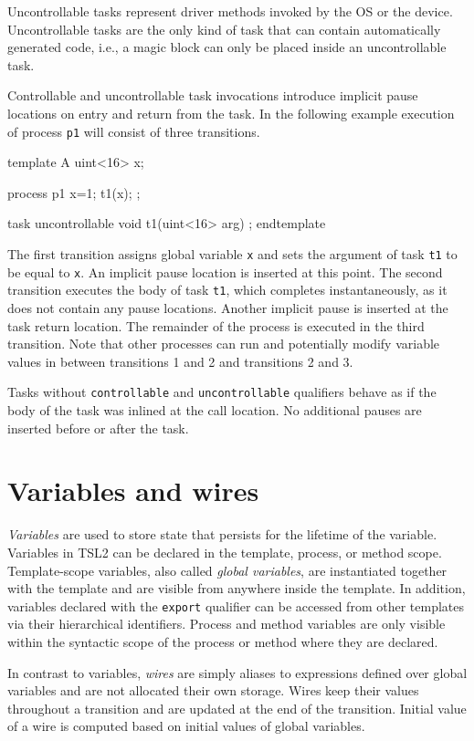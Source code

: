 \documentclass{report}
\newcommand{\src}[1]{\texttt{#1}}
\newcommand{\tsl}{TSL2 }
\begin{document}
Uncontrollable tasks represent driver methods invoked by the OS or 
the device.  Uncontrollable tasks are the only kind of task that 
can contain automatically generated code, i.e., a magic block can 
only be placed inside an uncontrollable task.  

Controllable and uncontrollable task invocations introduce 
implicit pause locations on entry and return from the task.  In 
the following example execution of process \src{p1} will consist 
of three transitions.
\begin{tsllisting}{}
template A
  uint<16> x;

  process p1 {
    x=1;
    t1(x);
  };

  task uncontrollable void t1(uint<16> arg) {};
endtemplate
\end{tsllisting}
The first transition assigns global variable \src{x} and sets the 
argument of task \src{t1} to be equal to \src{x}.   An implicit 
pause location is inserted at this point.  The second transition 
executes the body of task \src{t1}, which completes 
instantaneously, as it does not contain any pause locations.  
Another implicit pause is inserted at the task return location.  
The remainder of the process is executed in the third transition.  
Note that other processes can run and potentially modify variable 
values in between transitions 1 and 2 and transitions 2 and 3.

Tasks without \src{controllable} and \src{uncontrollable} 
qualifiers behave as if the body of the task was inlined at the 
call location.  No additional pauses are inserted before or after 
the task.

\section{Variables and wires}\label{s:o:variables}

\emph{Variables} are used to store state that persists for the 
lifetime of the variable.  Variables in \tsl can be declared in 
the template, process, or method scope.  Template-scope variables, 
also called \emph{global variables}, are instantiated together 
with the template and are visible from anywhere inside the 
template.  In addition, variables declared with the \src{export} 
qualifier can be accessed from other templates via their 
hierarchical identifiers.  Process and method variables are only 
visible within the syntactic scope of the process or method where 
they are declared.

In contrast to variables, \emph{wires} are simply aliases to 
expressions defined over global variables and are not allocated 
their own storage.  Wires keep their values throughout a 
transition and are updated at the end of the transition.  Initial 
value of a wire is computed based on initial values of global 
variables.
\end{document}
